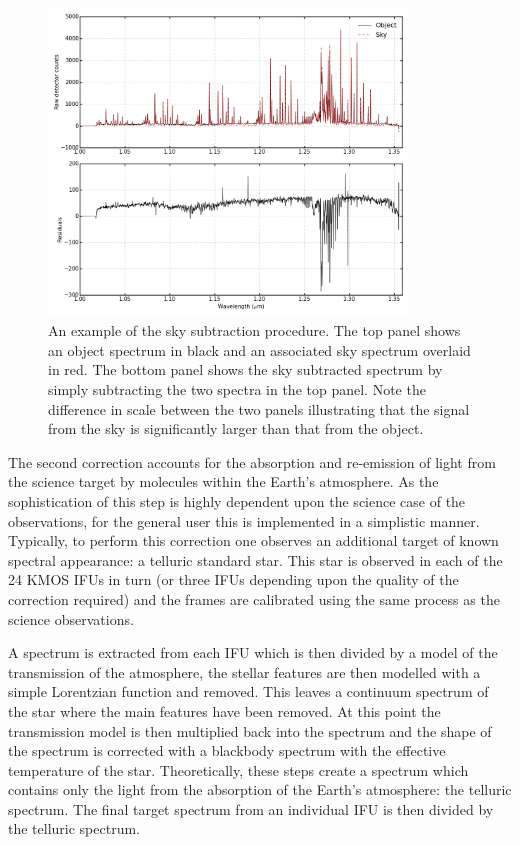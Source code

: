 \begin{figure}
 \centering
 \includegraphics[width=0.85\textwidth]{kmos/NGC55-19-skysub_basic}
 \caption[Example of the sky subtraction procedure]{An example of the sky subtraction procedure. The top panel shows an object spectrum in black and an associated sky spectrum overlaid in red.
 The bottom panel shows the sky subtracted spectrum by simply subtracting the two spectra in the top panel.
 Note the difference in scale between the two panels illustrating that the signal from the sky is significantly larger than that from the object.
 \label{fig:skysub}}
\end{figure}

The second correction accounts for the absorption and re-emission of light from the science target by molecules within the Earth's atmosphere.
As the sophistication of this step is highly dependent upon the science case of the observations, for the general user this is implemented in a simplistic manner.
Typically, to perform this correction one observes an additional target of known spectral appearance: a telluric standard star.
This star is observed in each of the 24 KMOS IFUs in turn (or three IFUs depending upon the quality of the correction required) and the frames are calibrated using the same process as the science observations.

A spectrum is extracted from each IFU which is then divided by a model of the transmission of the atmosphere, the stellar features are then modelled with a simple Lorentzian function and removed.
This leaves a continuum spectrum of the star where the main features have been removed.
At this point the transmission model is then multiplied back into the spectrum and the shape of the spectrum is corrected with a blackbody spectrum with the effective temperature of the star.
Theoretically, these steps create a spectrum which contains only the light from the absorption of the Earth's atmosphere: the telluric spectrum.
The final target spectrum from an individual IFU is then divided by the telluric spectrum.

